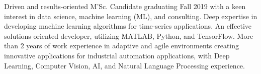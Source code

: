 

\begin{cvparagraph}

Driven and results-oriented M'Sc. Candidate graduating Fall 2019 with a keen interest in data science, machine learning (ML), and consulting. Deep expertise in developing machine learning algorithms for time-series applications. An effective solutions-oriented developer, utilizing MATLAB, Python, and TensorFlow. More than 2 years of work experience in adaptive and agile environments creating innovative applications for industrial automation applications, with Deep Learning, Computer Vision, AI, and Natural Language Processing experience.
\end{cvparagraph}
